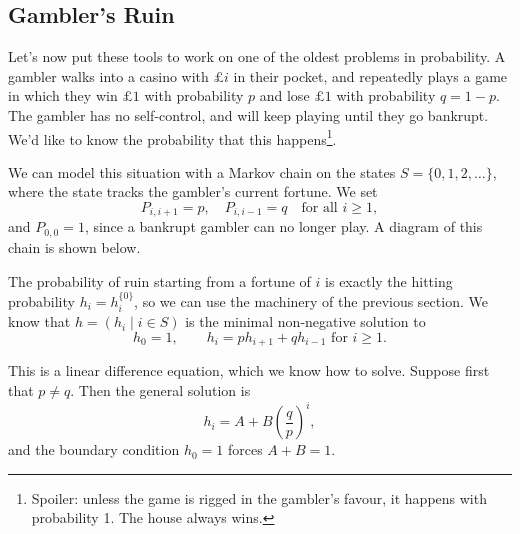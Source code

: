 \documentclass[a4paper]{scrartcl}
\begin{document}
\subsection{Gambler's Ruin}

Let's now put these tools to work on one of the oldest problems in probability. A gambler walks into a casino with $\pounds i$ in their pocket, and repeatedly plays a game in which they win $\pounds 1$ with probability $p$ and lose $\pounds 1$ with probability $q = 1 - p$. The gambler has no self-control, and will keep playing until they go bankrupt. We'd like to know the probability that this happens\footnote{Spoiler: unless the game is rigged in the gambler's favour, it happens with probability 1. The house always wins.}.

We can model this situation with a Markov chain on the states $S = \{0, 1, 2, \dots\}$, where the state tracks the gambler's current fortune. We set
$$
P_{i, i + 1} = p, \quad P_{i, i - 1} = q \quad \text{for all } i \geq 1,
$$
and $P_{0, 0} = 1$, since a bankrupt gambler can no longer play. A diagram of this chain is shown below.

\begin{center}
	\end{center}

The probability of ruin starting from a fortune of $i$ is exactly the hitting probability $h_i = h_i^{\{0\}}$, so we can use the machinery of the previous section. We know that $h = (h_i \mid i \in S)$ is the minimal non-negative solution to
$$
h_0 = 1, \qquad h_i = p h_{i + 1} + q h_{i - 1} \text{ for } i \geq 1.
$$

This is a linear difference equation, which we know how to solve. Suppose first that $p \neq q$. Then the general solution is
$$
h_i = A + B \left(\frac{q}{p}\right)^i,
$$
and the boundary condition $h_0 = 1$ forces $A + B = 1$.
\end{document}
